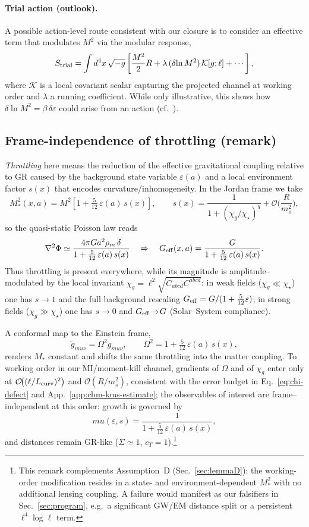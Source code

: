 \documentclass[aps,prd,onecolumn,superscriptaddress,nofootinbib]{revtex4-2}
\def\mu{mu}%
\def\Omega_\Lambda{OmegaLambda}%
\begin{document}
\paragraph{Trial action (outlook).}
A possible action-level route consistent with our closure is to consider an effective term that modulates \(M^2\) via the modular response,
\[
S_{\rm trial}=\int d^4x \,\sqrt{-g}\left[\frac{M^2}{2}R + \lambda\,(\delta\!\ln M^2)\,\mathcal{K}[g;\ell] + \cdots\right],
\]
where \(\mathcal K\) is a local covariant scalar capturing the projected channel at working order and \(\lambda\) a running coefficient. While only illustrative, this shows how \(\delta\!\ln M^2=\beta\,\delta\varepsilon\) could arise from an action (cf.\ \cite{Jacobson2016,Lashkari2014}).

\subsection{Frame-independence of throttling (remark)}
\label{sec:throttle-remark}
\emph{Throttling} here means the reduction of the effective gravitational coupling relative to GR caused by the background state variable $\varepsilon(a)$ and a local environment factor $s(x)$ that encodes curvature/inhomogeneity.
In the Jordan frame we take
\[
M_*^2(x,a)=M^2\!\left[1+\tfrac{5}{12}\,\varepsilon(a)\,s(x)\right],\qquad
s(x)=\frac{1}{1+(\chi_g/\chi_\star)^q}+\mathcal O\!\Big(\frac{R}{m_s^2}\Big),
\]
so the quasi-static Poisson law reads
\[
\nabla^2\Phi \simeq \frac{4\pi G a^2 \rho_m\,\delta}{1+\tfrac{5}{12}\,\varepsilon(a)\,s(x)}
\quad\Rightarrow\quad
G_{\rm eff}(x,a)=\frac{G}{1+\tfrac{5}{12}\,\varepsilon(a)\,s(x)}.
\]
Thus throttling is present everywhere, while its magnitude is amplitude–modulated by the local invariant $\chi_g=\ell^2\sqrt{C_{abcd}C^{abcd}}$: in weak fields ($\chi_g\!\ll\!\chi_\star$) one has $s\!\to\!1$ and the full background rescaling $G_{\rm eff}=G/(1+\tfrac{5}{12}\varepsilon)$; in strong fields ($\chi_g\!\gg\!\chi_\star$) one has $s\!\to\!0$ and $G_{\rm eff}\!\to\!G$ (Solar–System compliance).

A conformal map to the Einstein frame,
\[
\tilde g_{\mu\nu}=\Omega^2 g_{\mu\nu},\qquad \Omega^2=1+\tfrac{5}{12}\,\varepsilon(a)\,s(x),
\]
renders $M_*$ constant and shifts the same throttling into the matter coupling. To working order in our MI/moment-kill channel, gradients of $\Omega$ and of $\chi_g$ enter only at $\mathcal O\!\big((\ell/L_{\rm curv})^2\big)$ and $\mathcal O(R/m_s^2)$, consistent with the error budget in Eq.~\eqref{eq:chi-defect} and App.~\ref{app:chm-kms-estimate}; the observables of interest are frame–independent at this order: growth is governed by
\[
\mu(\varepsilon,s)=\frac{1}{1+\tfrac{5}{12}\,\varepsilon(a)\,s(x)}, 
\]
and distances remain GR-like ($\Sigma\simeq 1$, $c_T=1$).\footnote{This remark complements Assumption~D (Sec.~\ref{sec:lemmaD}): the working-order modification resides in a state- and environment-dependent $M_*^2$ with no additional lensing coupling. A failure would manifest as our falsifiers in Sec.~\ref{sec:program}, e.g.\ a significant GW/EM distance split or a persistent $\ell^4\log\ell$ term.}
\end{document}
